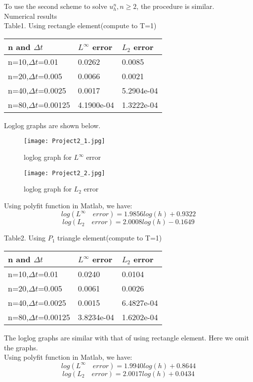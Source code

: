 \documentclass[a4paper,11pt]{article}
\begin{document}
\begin{CJK}{UTF8}{gbsn}
\noindent To use the second scheme to solve $u^{n}_{h}, n \geq 2$, the procedure is similar.\\ 

\noindent Numerical results \\
Table1. Using rectangle element(compute to T=1)
\begin{center}
\begin{tabular}{|p{3.2cm}|p{3.5cm}|p{3.5cm}|}
\hline
\textbf{ n and $\Delta t$} & \textbf{$L^{\infty}$ error} & \textbf{$L_{2}$ error} \\ \hline
n=10,$\Delta t$=0.01 & 0.0262 & 0.0085 \\ \hline
n=20,$\Delta t$=0.005 & 0.0066 & 0.0021 \\ \hline
n=40,$\Delta t$=0.0025 & 0.0017 & 5.2904e-04 \\ \hline
n=80,$\Delta t$=0.00125 & 4.1900e-04  & 1.3222e-04 \\ \hline
\end{tabular}
\end{center}
Loglog graphs are shown below.\\
\begin{figure}
 \caption{loglog graph for $L^{\infty}$ error}
\texttt{[image: Project2\_1.jpg]}
\end{figure}
\begin{figure}
 \caption{loglog graph for $L_{2}$ error}
\texttt{[image: Project2\_2.jpg]}
\end{figure}

\noindent Using polyfit function in Matlab, we have:\\
$$log(L^{\infty}\quad error) = 1.9856log(h) + 0.9322$$
$$log(L_{2} \quad error) = 2.0008log(h) - 0.1649$$

\noindent Table2. Using $P_{1}$ triangle element(compute to T=1)
\begin{center}
\begin{tabular}{|p{3.2cm}|p{3.5cm}|p{3.5cm}|}
\hline
\textbf{ n and $\Delta t$} & \textbf{$L^{\infty}$ error} & \textbf{$L_{2}$ error} \\ \hline
n=10,$\Delta t$=0.01 & 0.0240 & 0.0104 \\ \hline
n=20,$\Delta t$=0.005 & 0.0061 & 0.0026 \\ \hline
n=40,$\Delta t$=0.0025 & 0.0015 & 6.4827e-04 \\ \hline
n=80,$\Delta t$=0.00125 & 3.8234e-04  & 1.6202e-04 \\ \hline
\end{tabular}
\end{center}
\noindent The loglog graphs are similar with that of using rectangle element. Here we omit the graphs.\\
\noindent Using polyfit function in Matlab, we have:\\
$$log(L^{\infty}\quad error) = 1.9940log(h) + 0.8644$$
$$log(L_{2} \quad error) = 2.0017log(h) + 0.0434$$

\end{CJK}
\end{document}
